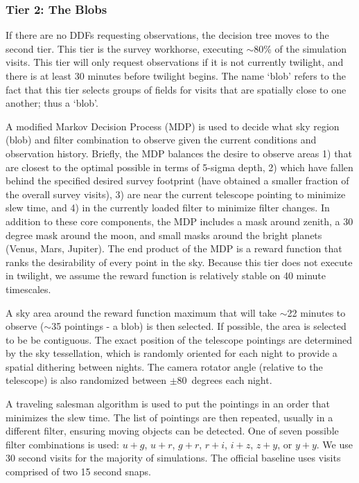 \subsubsection{Tier 2:  The Blobs}

If there are no DDFs requesting observations, the decision tree moves to the second tier. This tier is the survey workhorse, executing $\sim$80\% of the simulation visits.  This tier will only request observations if it is not currently twilight, and there is at least 30 minutes before twilight begins. The name `blob' refers to the fact that this tier selects groups of fields for visits that are spatially close to one another; thus a `blob'. 

A modified Markov Decision Process (MDP) is used to decide what sky region (blob) and filter combination to observe given the current conditions and observation history. Briefly, the MDP balances the desire to observe areas 1) that are closest to the optimal possible in terms of 5-sigma depth, 2) which have fallen behind the specified desired survey footprint (have obtained a smaller fraction of the overall survey visits), 3) are near the current telescope pointing to minimize slew time, and 4) in the currently loaded filter to minimize filter changes.  In addition to these core components, the MDP includes a mask around zenith, a 30 degree mask around the moon, and small masks around the bright planets (Venus, Mars, Jupiter). The end product of the MDP is a reward function that ranks the desirability of every point in the sky. Because this tier does not execute in twilight, we assume the reward function is relatively stable on 40 minute timescales.

A sky area around the reward function maximum that will take $\sim$22 minutes to observe ($\sim$35 pointings - a blob) is then selected. If possible, the area is selected to be be contiguous.  The exact position of the telescope pointings are determined by the sky tessellation, which is randomly oriented for each night to provide a spatial dithering between nights. The camera rotator angle (relative to the telescope) is also randomized between $\pm 80$\ degrees each night.

A traveling salesman algorithm is used to put the pointings in an order that minimizes the slew time. The list of pointings are then repeated, usually in a different filter, ensuring moving objects can be detected.  One of seven possible filter combinations is used: $u+g$, $u+r$, $g+r$, $r+i$, $i+z$, $z+y$, or $y+y$.  We use 30 second visits for the majority of simulations. The official baseline uses visits comprised of two 15 second snaps.  


